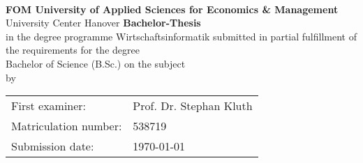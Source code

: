 \begin{titlepage}
\thispagestyle{empty}
\begin{center}
\\
\Large\textbf{FOM University of Applied Sciences for Economics \& Management}\\
\normalsize University Center Hanover
\vfill
\large\textbf{Bachelor-Thesis}\\
\normalsize in the degree programme Wirtschaftsinformatik
\vfill
\normalsize submitted in partial fulfillment of the requirements for the degree\\
\Large Bachelor of Science (B.Sc.)
\vfill
on the subject\\
\Large\textbf{\thetitle}
\vfill
\normalsize by\\
\Large \theauthor
\vfill
\begin{table}[h]
\begin{tabular}{@{}ll@{}}
First examiner: & Prof. Dr. Stephan Kluth\\
Matriculation number: & 538719\\
Submission date: & \today
\end{tabular}
\end{table}
\end{center}
\end{titlepage}
